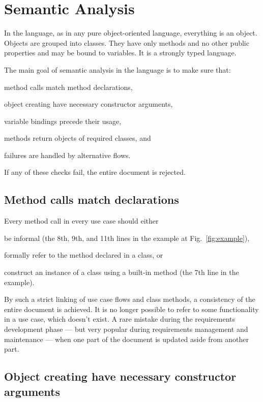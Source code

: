 \documentclass[sigplan,10pt,screen]{acmart}
\begin{document}
\section{Semantic Analysis}
\label{sec:semantic}

In the language, as in any pure object-oriented language, everything is
an object. Objects are grouped into classes. They have only methods
and no other public properties and may be bound to variables.
It is a strongly typed language.

The main goal of semantic analysis in the language is to make sure that:
\begin{inparaenum}
\item method calls match method declarations,
\item object creating have necessary constructor arguments,
\item variable bindings precede their usage,
\item methods return objects of required classes, and
\item failures are handled by alternative flows.
\end{inparaenum}
If any of these checks fail, the entire document is rejected.

\subsection{Method calls match declarations}

Every method call in every use case should either
\begin{inparaenum}
\item be informal (the 8th, 9th, and 11th lines in the example at Fig.~\ref{fig:example}),
\item formally refer to the method declared in a class, or
\item construct an instance of a class using a built-in method  (the 7th line in the example).
\end{inparaenum}

By such a strict linking of use case flows and class methods, a consistency
of the entire document is achieved. It is no longer possible to refer to
some functionality in a use case, which doesn't exist. A rare mistake during
the requirements development phase --- but very popular during requirements
management and maintenance --- when one part of the document is updated aside
from another part.

\subsection{Object creating have necessary constructor arguments}
\end{document}
